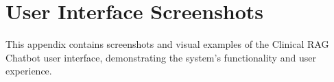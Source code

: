 \chapter{User Interface Screenshots}
\label{appendix:ui}

This appendix contains screenshots and visual examples of the Clinical RAG Chatbot user interface, demonstrating the system's functionality and user experience.


\blindtext %
